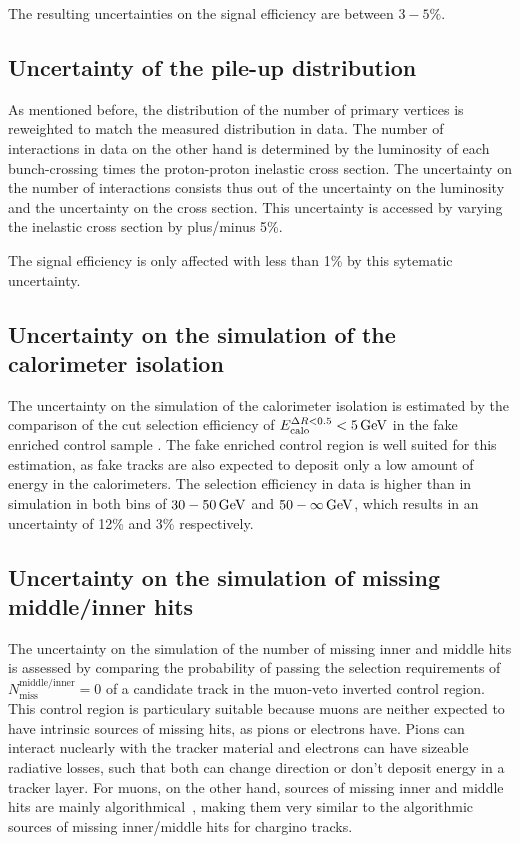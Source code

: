 The resulting uncertainties on the signal efficiency are between $3-5\%$.

\subsection*{Uncertainty of the pile-up distribution}
As mentioned before, the distribution of the number of primary vertices is reweighted to match the measured distribution in data.
The number of interactions in data on the other hand is determined by the luminosity of each bunch-crossing times the proton-proton inelastic cross section.
The uncertainty on the number of interactions consists thus out of the uncertainty on the luminosity and the uncertainty on the cross section.
This uncertainty is accessed by varying the inelastic cross section by plus/minus 5\%.

The signal efficiency is only affected with less than 1\% by this sytematic uncertainty.

\subsection*{Uncertainty on the simulation of the calorimeter isolation}
The uncertainty on the simulation of the calorimeter isolation \ecalo is estimated by the comparison of the cut selection efficiency of $E^{\Delta R<0.5}_{\text{calo}}<5\,\text{Ge}\kern-0.06667em\text{V}$ in the fake enriched control sample \fakeCR.
The fake enriched control region is well suited for this estimation, as fake tracks are also expected to deposit only a low amount of energy in the calorimeters.
The selection efficiency in data is higher than in simulation in both \pt bins of $30-50\,\text{Ge}\kern-0.06667em\text{V}$ and $50-\infty\,\text{Ge}\kern-0.06667em\text{V}$, which results in an uncertainty of 12\% and 3\% respectively.


\subsection*{Uncertainty on the simulation of missing middle/inner hits}
The uncertainty on the simulation of the number of missing inner and middle hits is assessed by comparing the probability of passing the selection requirements of $N_{\text{miss}}^{\text{middle/inner}}=0$
of a candidate track in the muon-veto inverted control region. 
This control region is particulary suitable because muons are neither expected to have intrinsic sources of missing hits, as pions or electrons have.
Pions can interact nuclearly with the tracker material and electrons can have sizeable radiative losses, such that both can change direction or don't deposit energy in a tracker layer.
For muons, on the other hand, sources of missing inner and middle hits are mainly algorithmical~\cite{bib:CMS:DT_Thesis,bib:CMS:DT_8TeV_AN}, 
making them very similar to the algorithmic sources of missing inner/middle hits for chargino tracks.

